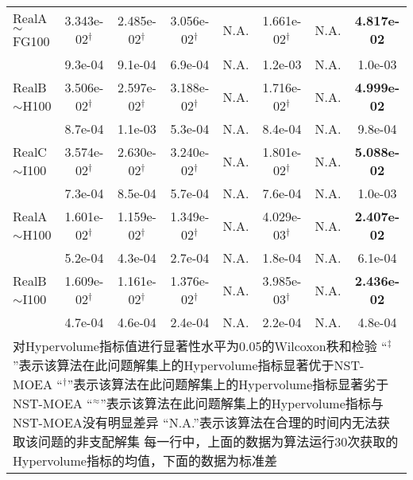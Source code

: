{\begin{longtable}[c]{lccccccc}
    RealA$\sim$FG100      & 3.343e-02$^{\dag}$ & 2.485e-02$^{\dag}$ & 3.056e-02$^{\dag}$ & N.A.               & 1.661e-02$^{\dag}$ & N.A.                & \textbf{4.817e-02} \\
      & 9.3e-04            & 9.1e-04            & 6.9e-04            & N.A.               & 1.2e-03            & N.A.                          & 1.0e-03            \\
    \midrule
    RealB$\sim$H100      & 3.506e-02$^{\dag}$ & 2.597e-02$^{\dag}$ & 3.188e-02$^{\dag}$ & N.A.               & 1.716e-02$^{\dag}$ & N.A.                 & \textbf{4.999e-02} \\
            & 8.7e-04            & 1.1e-03            & 5.3e-04            & N.A.               & 8.4e-04            & N.A.                           & 9.8e-04            \\
    \midrule
    RealC$\sim$I100      & 3.574e-02$^{\dag}$ & 2.630e-02$^{\dag}$ & 3.240e-02$^{\dag}$ & N.A.               & 1.801e-02$^{\dag}$ & N.A.                & \textbf{5.088e-02} \\
             & 7.3e-04            & 8.5e-04            & 5.7e-04            & N.A.               & 7.6e-04            & N.A.                           & 1.0e-03            \\
    \midrule

    RealA$\sim$H100     & 1.601e-02$^{\dag}$ & 1.159e-02$^{\dag}$ & 1.349e-02$^{\dag}$ & N.A.               & 4.029e-03$^{\dag}$ & N.A.               & \textbf{2.407e-02} \\
           & 5.2e-04            & 4.3e-04            & 2.7e-04            & N.A.               & 1.8e-04            & N.A.                          & 6.1e-04            \\
    \midrule
    RealB$\sim$I100     & 1.609e-02$^{\dag}$ & 1.161e-02$^{\dag}$ & 1.376e-02$^{\dag}$ & N.A.               & 3.985e-03$^{\dag}$ & N.A.                 & \textbf{2.436e-02} \\
           & 4.7e-04            & 4.6e-04            & 2.4e-04            & N.A.               & 2.2e-04            & N.A.                      & 4.8e-04            \\
    \bottomrule
    \multicolumn{8}{p{45em}}{
        对Hypervolume指标值进行显著性水平为0.05的Wilcoxon秩和检验\vspace{-.75em}\newline{}
        “$^\ddag$”表示该算法在此问题解集上的Hypervolume指标显著优于NST-MOEA\vspace{-.75em}\newline{}
        “$^\dag$”表示该算法在此问题解集上的Hypervolume指标显著劣于NST-MOEA\vspace{-.75em}\newline{}
        “$^\approx$”表示该算法在此问题解集上的Hypervolume指标与NST-MOEA没有明显差异\vspace{-.75em}\newline{}
        “N.A.”表示该算法在合理的时间内无法获取该问题的非支配解集\vspace{-.75em}\newline{}
        每一行中，上面的数据为算法运行30次获取的Hypervolume指标的均值，下面的数据为标准差
        }
\end{longtable}
}%
